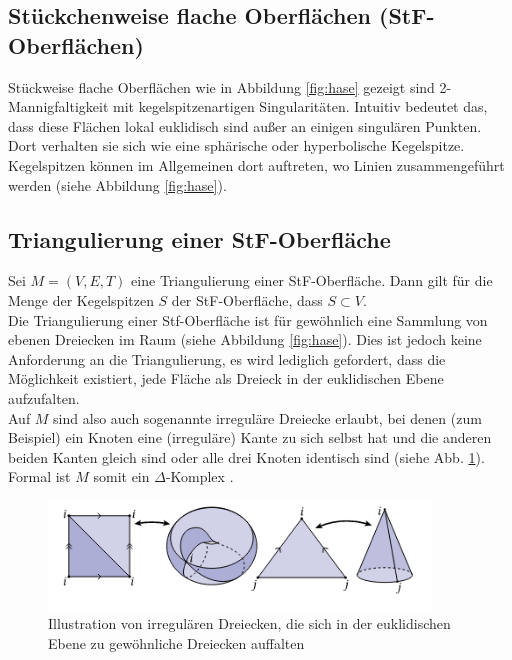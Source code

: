 \subsection*{Stückchenweise flache Oberflächen (StF-Oberflächen)}

Stückweise flache Oberflächen wie in Abbildung \ref{fig:hase} gezeigt sind 2-Mannigfaltigkeit mit kegelspitzenartigen Singularitäten. Intuitiv bedeutet das, dass diese Flächen lokal euklidisch sind außer an einigen singulären Punkten. Dort verhalten sie sich wie eine sphärische oder hyperbolische Kegelspitze. Kegelspitzen können im Allgemeinen dort auftreten, wo Linien zusammengeführt werden (siehe Abbildung \ref{fig:hase}).

\subsection*{Triangulierung  einer  StF-Oberfläche}
Sei $M = (V,E,T)$ eine Triangulierung einer StF-Oberfläche. Dann gilt für die Menge der Kegelspitzen $S$ der StF-Oberfläche, dass $S \subset V$.\\ 
 
Die Triangulierung einer Stf-Oberfläche ist für gewöhnlich eine Sammlung von ebenen Dreiecken im Raum (siehe Abbildung \ref{fig:hase}). Dies ist jedoch keine Anforderung an die Triangulierung, es wird lediglich gefordert, dass die Möglichkeit existiert, jede Fläche als Dreieck in der euklidischen Ebene aufzufalten. \\  

Auf $M$ sind also auch sogenannte irreguläre Dreiecke erlaubt, bei denen (zum Beispiel) ein Knoten eine (irreguläre) Kante zu sich selbst hat und die anderen beiden Kanten gleich sind oder alle drei Knoten identisch sind (siehe Abb. \ref{fig:auffaltung_irregulaer}).
Formal ist $M$  somit ein $\Delta$-Komplex \cite[abschnitt 2.1]{hatcher:2005:deltakomplex}.\\
 
\begin{figure}[H]%
    \centering
  \includegraphics[width=4in]{images/auffaltung_irregulaer.png}
  \caption{Illustration von irregulären Dreiecken, die sich in der  euklidischen Ebene zu gewöhnliche Dreiecken auffalten \cite{Sharp:2019:NIT}}
\label{fig:auffaltung_irregulaer}
\end{figure}


